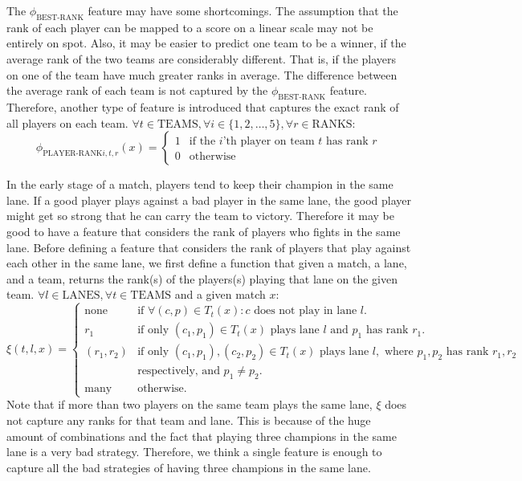 The $\phi_\text{BEST-RANK}$ feature may have some shortcomings. The assumption that the rank of each player can be mapped to a score on a linear scale may not be entirely on spot.
Also, it may be easier to predict one team to be a winner, if the average rank of the two teams are considerably different. That is, if the players on one of the team have much greater ranks in average. The difference between the average rank of each team is not captured by the $\phi_\text{BEST-RANK}$ feature.
Therefore, another type of feature is introduced that captures the exact rank of all players on each team.
$\forall t \in \text{TEAMS}, \forall i \in \{1,2,\dots,5\}, \forall r \in \text{RANKS}$:
\begin{equation}\label{eq:playerrank}
\phi_{\text{PLAYER-RANK}i,t,r}(x) = 
\begin{cases} 
  1 & \text{if the } i \text{'th player on team } t \text{ has rank } r\\
  0 & \text{otherwise} 
\end{cases}  
\end{equation}

In the early stage of a match, players tend to keep their champion in the same lane.
If a good player plays against a bad player in the same lane, the good player might get so strong that he can carry the team to victory.
Therefore it may be good to have a feature that considers the rank of players who fights in the same lane.
Before defining a feature that considers the rank of players that play against each other in the same lane,
we first define a function that given a match, a lane, and a team, returns the rank(s) of the players(s) playing that lane on the given team.
$\forall l \in \text{LANES}, \forall t \in \text{TEAMS}$ and a given match $x$:
\begin{equation}\label{eq:xi}
  \xi(t,l,x) =
\begin{cases} 
  \text{none} & \text{if } \forall(c, p) \in T_t(x): c \text{ does not play in lane } l. \\
  r_1 & \text{if only } (c_1, p_1) \in T_t(x) \text{ plays lane } l \text{ and } p_1 \text{ has rank } r_1 \text{.}\\
  (r_1, r_2) & \text{if only } (c_1, p_1), (c_2, p_2) \in T_t(x) \text{ plays lane } l, \text{ where } p_1, p_2 \text{ has rank } r_1, r_2\\ 
&\text{respectively, and } p_1 \neq p_2.\\
  \text{many} & \text{otherwise}.
\end{cases}
\end{equation}
Note that if more than two players on the same team plays the same lane, $\xi$ does not capture any ranks for that team and lane. This is because of the huge amount of combinations and the fact that playing three champions in the same lane is a very bad strategy. Therefore, we think a single feature is enough to capture all the bad strategies of having three champions in the same lane.
 
